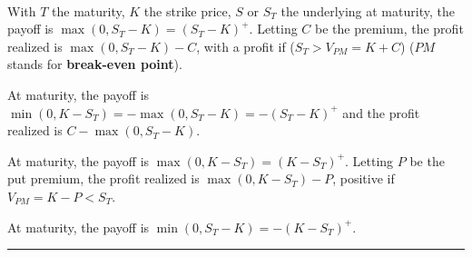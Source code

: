 \begin{f}

\ %



With \(T\) the maturity, \(K\) the strike price, \(S\) or \(S_T\) the underlying at maturity, the payoff is \(\max (0, S_T-K)=( S_T-K)^{+}\).
Letting \(C\) be the premium, the profit realized is \(\max (0, S_T-K)-C\), with a profit if (\(S_T>V_{PM}=K + C\)) (\(PM\) stands for \textbf{break-even point}).

		


\medskip



At maturity, the payoff is \(\min (0,K- S_T)=-\max(0, S_T-K)=-( S_T-K)^{+}\) and the profit realized is \(C-\max (0, S_T-K)\).

\medskip

		
\medskip



At maturity, the payoff is \(\max (0,K- S_T)=(K- S_T)^{+}\).
Letting \(P\) be the put premium, the profit realized is \(\max (0,K- S_T)-P\), positive if \(V_{PM}=K -P<S_T\).

\medskip

	    	     


\medskip

	    	     

At maturity, the payoff is \(\min (0, S_T-K)=-(K- S_T)^+\).


\end{f}
\hrule

